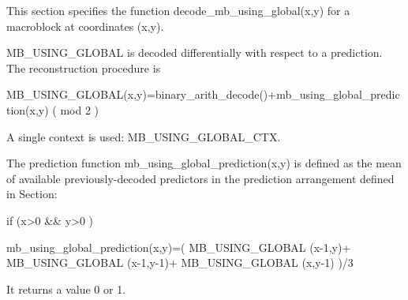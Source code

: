 This section specifies the function decode\_mb\_using\_global(x,y) for a
macroblock at coordinates (x,y).

MB\_USING\_GLOBAL is decoded differentially with respect to a prediction.
The reconstruction procedure is 

MB\_USING\_GLOBAL(x,y)=binary\_arith\_decode()+mb\_using\_global\_prediction(x,y)
( mod 2 )

A single context is used: MB\_USING\_GLOBAL\_CTX.

The prediction function mb\_using\_global\_prediction(x,y) is defined as
the mean of available previously-decoded predictors in the prediction
arrangement defined in Section:

if (x>0 \&\& y>0 )

    mb\_using\_global\_prediction(x,y)=( MB\_USING\_GLOBAL (x-1,y)+
                                                              MB\_USING\_GLOBAL (x-1,y-1)+
                                                              MB\_USING\_GLOBAL (x,y-1) )/3

It returns a value 0 or 1.

